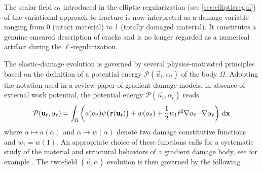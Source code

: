 The scalar field $\alpha_t$ introduced in the elliptic regularization (see \cref{sec:ellipticregul}) of the variational approach to fracture is now interpreted as a damage variable ranging from 0 (intact material) to 1 (totally damaged material). It constitutes a genuine smeared description of cracks and is no longer regarded as a numerical artifact during the $\ell$-regularization.

The elastic-damage evolution is governed by several physics-motivated principles based on the definition of a potential energy $\mathcal{P}(\vec{u}_t,\alpha_t)$ of the body $\Omega$. Adopting the notation used in a review paper \cite{PhamAmorMarigoMaurini:2011} of gradient damage models, in absence of external work potential, the potential energy $\mathcal{P}(\vec{u}_t,\alpha_t)$ reads
\begin{equation} \label{eq:Pgd}
\mathcal{P}(\vec{u}_t,\alpha_t)=\int_\Omega\left( a(\alpha_t)\psi\bigl(\eps(\vec{u}_t)\bigr)+w(\alpha_t)+\frac{1}{2}w_1\ell^2\nabla\alpha_t\cdot\nabla\alpha_t\right)\dx
\end{equation}
where $\alpha\mapsto a(\alpha)$ and $\alpha\mapsto w(\alpha)$ denote two damage constitutive functions and $w_1=w(1)$. An appropriate choice of these functions calls for a systematic study of the material and structural behaviors of a gradient damage body, see for example \cite{PhamMarigo:2013,PhamAmorMarigoMaurini:2011,PhamMarigoMaurini:2011}. The two-field $(\vec{u},\alpha)$ evolution is then governed by the following
